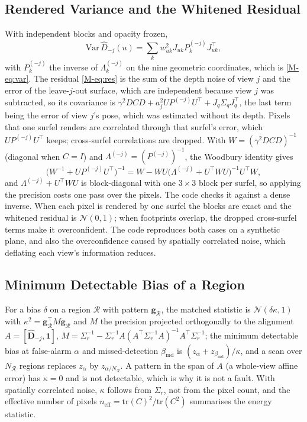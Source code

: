 \subsection{Rendered Variance and the Whitened Residual}
With independent blocks and opacity frozen,
\[
\mathrm{Var}\,\hat D_{-j}(u)=\sum_kw_{uk}^{2}J_{uk}P_k^{(-j)}J_{uk}^{\top},
\]
with $P_k^{(-j)}$ the inverse of $\Lambda_k^{(-j)}$ on the nine geometric coordinates, which is \eqref{M-eq:var}. The residual \eqref{M-eq:res} is the sum of the depth noise of view $j$ and the
error of the leave-$j$-out surface, which are independent because view $j$ was subtracted, so its
covariance is $\gamma^{2}DCD+a_j^{2}UP^{(-j)}U^{\top}+J_q\Sigma_qJ_q^{\top}$, the last term being the error of view
$j$'s pose, which was estimated without its depth. Pixels that one surfel renders are correlated through
that surfel's error, which $UP^{(-j)}U^{\top}$ keeps; cross-surfel correlations are dropped. With
$W=(\gamma^{2}DCD)^{-1}$ (diagonal when $C=I$) and $\Lambda^{(-j)}=(P^{(-j)})^{-1}$, the Woodbury identity
gives
\[
\bigl(W^{-1}+UP^{(-j)}U^{\top}\bigr)^{-1}=W-WU\bigl(\Lambda^{(-j)}+U^{\top}WU\bigr)^{-1}U^{\top}W,
\]
and $\Lambda^{(-j)}+U^{\top}WU$ is block-diagonal with one $3\times3$ block per surfel, so applying the
precision costs one pass over the pixels. The code checks it against a dense inverse. When each
pixel is rendered by one surfel the blocks are exact and the whitened residual is $\mathcal{N}(0,1)$;
when footprints overlap, the dropped cross-surfel terms make it overconfident. The code reproduces both
cases on a synthetic plane, and also the overconfidence caused by spatially correlated noise, which
deflating each view's information reduces.

\subsection{Minimum Detectable Bias of a Region}
For a bias $\delta$ on a region $\mathcal{R}$ with pattern $\mathbf{g}_{\mathcal{R}}$, the matched statistic is
$\mathcal{N}(\delta\kappa,1)$ with $\kappa^{2}=\mathbf{g}_{\mathcal{R}}^{\top}M\mathbf{g}_{\mathcal{R}}$ and $M$ the precision projected
orthogonally to the alignment $A=[\hat{\mathbf{D}}_{-j},\mathbf{1}]$,
$M=\Sigma_r^{-1}-\Sigma_r^{-1}A(A^{\top}\Sigma_r^{-1}A)^{-1}A^{\top}\Sigma_r^{-1}$; the minimum detectable bias at
false-alarm $\alpha$ and missed-detection $\beta_{\mathrm{md}}$ is
$(z_{\alpha}+z_{\beta_{\mathrm{md}}})/\kappa$, and a scan over $N_{\mathcal{R}}$ regions replaces $z_\alpha$ by
$z_{\alpha/N_{\mathcal{R}}}$. A pattern in the span of $A$ (a whole-view affine error) has $\kappa=0$ and is not
detectable, which is why it is not a fault. With spatially correlated noise, $\kappa$ follows from
$\Sigma_r$, not from the pixel count, and the effective number of pixels
$n_{\mathrm{eff}}=\mathrm{tr}(C)^{2}/\mathrm{tr}(C^{2})$ summarises the energy statistic.

